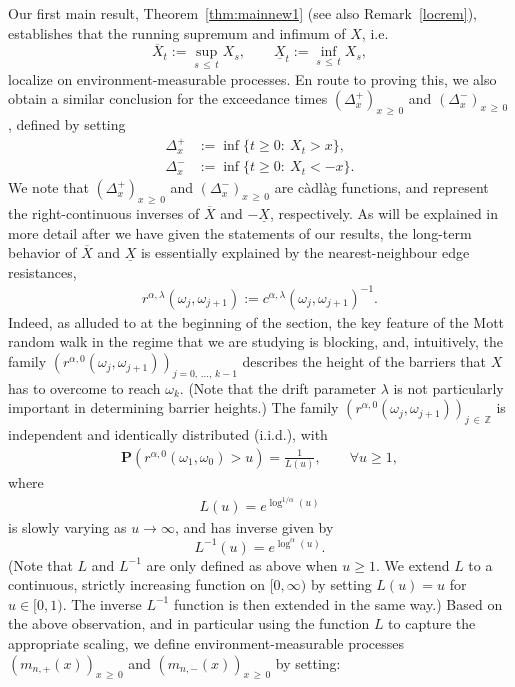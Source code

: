 \documentclass[AHL,Unicode,longabstracts,published]{cedram}
\newcommand{\Z}{\mathbb Z}
\newcommand{\bfP}{\mathbf{P}}
\newcommand{\cadlag}{càdlàg }
\let\oldforall\forall
\renewcommand*{\forall}{\mathrel{\oldforall}}
\begin{document}
Our first main result, Theorem~\ref{thm:mainnew1} (see also Remark~\ref{locrem}), establishes that the running supremum and infimum of $X$, i.e.\
\[
\overline{X}_t:=\sup_{s\,\leq\,t}X_s,\qquad \underline{X}_t:=\inf_{s\,\leq\,t}X_s,
\]
localize on environment-measurable processes. En route to proving this, we also obtain a similar conclusion for the exceedance times $(\Delta^+_x)_{x\,\geq\,0}$ and $(\Delta^-_x)_{x\,\geq\,0}$, defined by setting
\begin{align*}
\Delta^+_{x}&:=\inf\{t\geq 0:\: X_t> x\},\\
\Delta^-_{x}&:=\inf\{t\geq 0:\: X_t<-x\}.
\end{align*}
We note that $(\Delta^+_x)_{x\,\geq\,0}$ and $(\Delta^-_{x})_{x\,\geq\,0}$ are \cadlag functions, and represent the right-continuous inverses of $\overline{X}$ and $-\underline{X}$, respectively. As will be explained in more detail after we have given the statements of our results, the long-term behavior of $\overline X $ and $\underline X$ is essentially explained by the nearest-neighbour edge resistances,
\begin{align*}
r^{\alpha,\lambda}(\omega_j,\omega_{j+1}):= c^{\alpha,\lambda}(\omega_j,\omega_{j+1})^{-1}.
\end{align*}
Indeed, as alluded to at the beginning of the section, the key feature of the Mott random walk in the regime that we are studying is blocking, and, intuitively, the family $(r^{\alpha,0}(\omega_{j},\omega_{j+1}))_{j=0,\,\dots,\,k-1}$ describes the height of the barriers that $X$ has to overcome to reach $\omega_k$. (Note that the drift parameter $\lambda$ is not particularly important in determining barrier heights.) The family $(r^{\alpha,0}(\omega_{j},\omega_{j+1}))_{j\,\in\,\Z}$ is independent and identically distributed (i.i.d.), with
\begin{align}\label{eq:slow_varying_tail}
\bfP\left(r^{\alpha,0}(\omega_1,\omega_0)>u\right)=\frac1{L(u)},\qquad \forall u\geq 1,
\end{align}
where
\begin{align}\label{ldef}
L(u)=e^{\log^{1/\alpha}(u)}
\end{align}
is slowly varying as $u\rightarrow\infty$, and has inverse given by
\begin{equation}\label{eq:inverse}
L^{-1}(u)=e^{\log^{\alpha}(u)}.
\end{equation}
(Note that $L$ and $L^{-1}$ are only defined as above when $u\geq 1$. We extend $L$ to a continuous, strictly increasing function on $[0,\infty)$ by setting $L(u)=u$ for $u\in [0,1)$. The inverse $L^{-1}$ function is then extended in the same way.) Based on the above observation, and in particular using the function $L$ to capture the appropriate scaling, we define environment-measurable processes $(m_{n,+}(x))_{x\,\geq\,0}$ and $(m_{n,-}(x))_{x\,\geq\,0}$ by setting:
\end{document}
